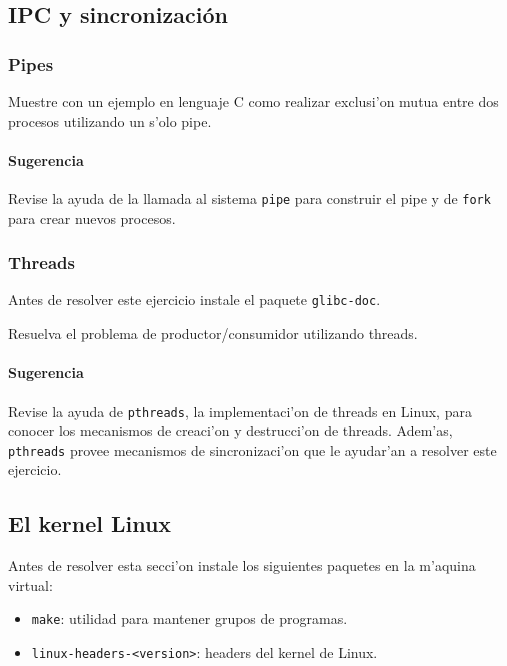 \subsection{IPC y sincronizaci\'on}

\subsubsection{Pipes}

Muestre con un ejemplo en lenguaje C como realizar exclusi'on mutua entre dos procesos utilizando un s'olo pipe.

\paragraph{Sugerencia}

Revise la ayuda de la llamada al sistema \texttt{pipe} para construir el pipe y de \texttt{fork} para crear
nuevos procesos.

\subsubsection{Threads}

Antes de resolver este ejercicio instale el paquete \texttt{glibc-doc}.

Resuelva el problema de productor/consumidor utilizando threads.

\paragraph{Sugerencia}

Revise la ayuda de \texttt{pthreads}, la implementaci'on de threads en Linux, para conocer los mecanismos de creaci'on y
destrucci'on de threads. Adem'as, \texttt{pthreads} provee mecanismos de sincronizaci'on que le ayudar'an a resolver este
ejercicio.

\subsection{El kernel Linux}

Antes de resolver esta secci'on instale los siguientes paquetes en la m'aquina virtual:

\begin{itemize}
\item \texttt{make}: utilidad para mantener grupos de programas.
\item \texttt{linux-headers-<version>}: headers del kernel de Linux.
\end{itemize}

